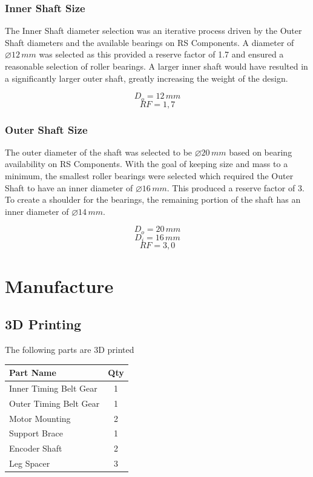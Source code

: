 \documentclass[11pt, titlepage]{article}
\begin{document}
\subsubsection{Inner Shaft Size}
The Inner Shaft diameter selection was an iterative process driven by the Outer Shaft diameters and the available bearings on RS Components. A diameter of $\diameter12\,mm$ was selected as this provided a reserve factor of 1.7 and ensured a reasonable selection of roller bearings. A larger inner shaft would have resulted in a significantly larger outer shaft, greatly increasing the weight of the design.

$$D_o = 12\,mm$$
$$RF = 1,7$$

\subsubsection{Outer Shaft Size}
The outer diameter of the shaft was selected to be $\diameter20\,mm$ based on bearing availability on RS Components. With the goal of keeping size and mass to a minimum, the smallest roller bearings were selected which required the Outer Shaft to have an inner diameter of $\diameter16\,mm$. This produced a reserve factor of 3. To create a shoulder for the bearings, the remaining portion of the shaft has an inner diameter of $\diameter14\,mm$.

$$D_o = 20\,mm$$
$$D_i = 16\,mm$$
$$RF=3,0$$



\newpage
\section{Manufacture}
\subsection{3D Printing}

The following parts are 3D printed

\begin{table}[h]
\centering
\begin{tabular}{ l c}
	\textbf{Part Name} & \textbf{Qty} \\\hline
	Inner Timing Belt Gear & 1 \\
	Outer Timing Belt Gear & 1 \\
	Motor Mounting & 2 \\
	Support Brace & 1 \\
	Encoder Shaft & 2 \\
	Leg Spacer & 3 \\\hline
\end{tabular}	
\end{table}
\end{document}
